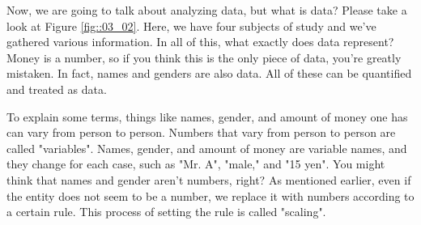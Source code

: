 \documentclass{ltjsbook}
\begin{document}


Now, we are going to talk about analyzing data, but what is data? Please take a look at Figure \ref{fig::03_02}. Here, we have four subjects of study and we've gathered various information. In all of this, what exactly does data represent? Money is a number, so if you think this is the only piece of data, you're greatly mistaken. In fact, names and genders are also data. All of these can be quantified and treated as data.

To explain some terms, things like names, gender, and amount of money one has can vary from person to person. Numbers that vary from person to person are called "variables". Names, gender, and amount of money are variable names, and they change for each case, such as "Mr. A", "male," and "15 yen". You might think that names and gender aren't numbers, right? As mentioned earlier, even if the entity does not seem to be a number, we replace it with numbers according to a certain rule. This process of setting the rule is called "scaling".


\end{document}
